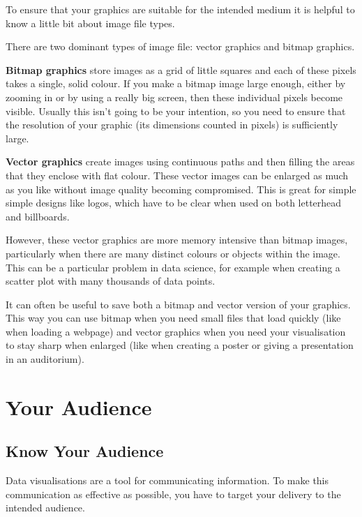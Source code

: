 \documentclass[
  12pt,
]{book}
\begin{document}
To ensure that your graphics are suitable for the intended medium it is helpful to know a little bit about image file types.

There are two dominant types of image file: vector graphics and bitmap graphics.

\textbf{Bitmap graphics} store images as a grid of little squares and each of these pixels takes a single, solid colour. If you make a bitmap image large enough, either by zooming in or by using a really big screen, then these individual pixels become visible. Usually this isn't going to be your intention, so you need to ensure that the resolution of your graphic (its dimensions counted in pixels) is sufficiently large.

\textbf{Vector graphics} create images using continuous paths and then filling the areas that they enclose with flat colour. These vector images can be enlarged as much as you like without image quality becoming compromised. This is great for simple simple designs like logos, which have to be clear when used on both letterhead and billboards.

However, these vector graphics are more memory intensive than bitmap images, particularly when there are many distinct colours or objects within the image. This can be a particular problem in data science, for example when creating a scatter plot with many thousands of data points.

It can often be useful to save both a bitmap and vector version of your graphics. This way you can use bitmap when you need small files that load quickly (like when loading a webpage) and vector graphics when you need your visualisation to stay sharp when enlarged (like when creating a poster or giving a presentation in an auditorium).

\hypertarget{your-audience}{%
\section{Your Audience 👥}\label{your-audience}}

\hypertarget{know-your-audience}{%
\subsection{Know Your Audience}\label{know-your-audience}}

Data visualisations are a tool for communicating information. To make this communication as effective as possible, you have to target your delivery to the intended audience.
\end{document}
